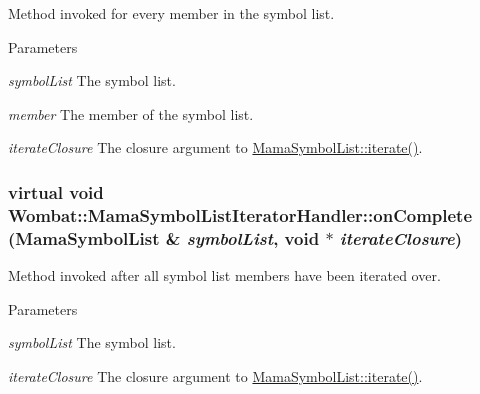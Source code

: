Method invoked for every member in the symbol list. 
\begin{DoxyParams}{Parameters}
\item[{\em symbolList}]The symbol list. \item[{\em member}]The member of the symbol list. \item[{\em iterateClosure}]The closure argument to \hyperlink{classWombat_1_1MamaSymbolList_abd26a14e154744f08713aab75c9aece3}{MamaSymbolList::iterate()}. \end{DoxyParams}
\hypertarget{classWombat_1_1MamaSymbolListIteratorHandler_a71f422a7d26ac1817a256e21086185d0}{
\subsubsection[{onComplete}]{\setlength{\rightskip}{0pt plus 5cm}virtual void Wombat::MamaSymbolListIteratorHandler::onComplete ({\bf MamaSymbolList} \& {\em symbolList}, \/  void $\ast$ {\em iterateClosure})}}
\label{classWombat_1_1MamaSymbolListIteratorHandler_a71f422a7d26ac1817a256e21086185d0}


Method invoked after all symbol list members have been iterated over. 
\begin{DoxyParams}{Parameters}
\item[{\em symbolList}]The symbol list. \item[{\em iterateClosure}]The closure argument to \hyperlink{classWombat_1_1MamaSymbolList_abd26a14e154744f08713aab75c9aece3}{MamaSymbolList::iterate()}. \end{DoxyParams}
